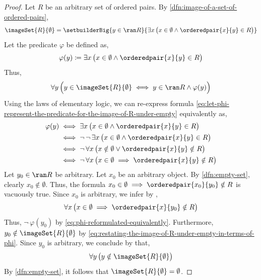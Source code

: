\begin{proof}
    Let \( R \) be an arbitrary set of ordered pairs. By \cref{dfn:image-of-a-set-of-ordered-pairs},
    \begin{equation*}
        \imageSet{R}{\emptyset} = \setbuilderBig{y \in \ran R}{\exists x \, \big( x \in \emptyset \land \orderedpair{x}{y} \in R \big)}
    \end{equation*}
    Let the predicate \( \varphi \) be defined as,
    \begin{equation}
        \label{eq:let-phi-represent-the-predicate-for-the-image-of-R-under-empty}
        \varphi(y) \coloneq \exists x \, \big( x \in \emptyset \land \orderedpair{x}{y} \in R \big)
    \end{equation}
    Thus,
    \begin{equation}
        \label{eq:restating-the-image-of-R-under-empty-in-terms-of-phi}
        \forall y \, \Big( y \in \imageSet{R}{\emptyset}
        \iff
        y \in \ran R
        \land
        \varphi(y)
        \Big)
    \end{equation}
    Using the laws of elementary logic, we can re-express formula \eqref{eq:let-phi-represent-the-predicate-for-the-image-of-R-under-empty}
    equivalently as,
    \begin{align}
        \label{eq:phi-reformulated-equivalently}
        \varphi(y) &\iff \exists x \, \big( x \in \emptyset \land \orderedpair{x}{y} \in R \big) \notag \\
        &\iff
        \lnot \, \lnot \, \exists x \, \big( x \in \emptyset \land \orderedpair{x}{y} \in R \big) \notag \\
        &\iff
        \lnot \, \forall x \, \big( x \notin \emptyset \lor \orderedpair{x}{y} \notin R \big) \notag \\
        &\iff
        \lnot \, \forall x \, \big( x \in \emptyset \implies \orderedpair{x}{y} \notin R \big)
    \end{align}
    Let \( y_{0} \in \ran R \) be arbitrary. Let \( x_{0} \) be an arbitrary object. By \cref{dfn:empty-set},
    clearly \( x_{0} \notin \emptyset \). Thus, the formula \( x_{0} \in \emptyset \implies \orderedpair{x_{0}}{y_{0}} \notin R \)
    is vacuously true. Since \( x_{0} \) is arbitrary, we infer by ,
    \begin{equation*}
        \forall x \, \big( x \in \emptyset \implies \orderedpair{x}{y_{0}} \notin R \big)
    \end{equation*}
    Thus, \( \lnot \, \varphi(y_{0}) \) by \eqref{eq:phi-reformulated-equivalently}. Furthermore, \( y_{0} \notin \imageSet{R}{\emptyset} \)
    by \eqref{eq:restating-the-image-of-R-under-empty-in-terms-of-phi}. Since \( y_{0} \) is arbitrary, we conclude by 
    that,
    \begin{equation*}
        \forall y \, \big( y \notin \imageSet{R}{\emptyset} \big)
    \end{equation*}
    By \cref{dfn:empty-set}, it follows that \( \imageSet{R}{\emptyset} = \emptyset \).
\end{proof}

